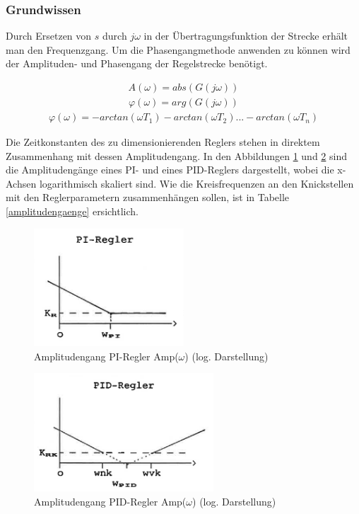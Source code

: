 \subsubsection{Grundwissen}
Durch Ersetzen von $s$ durch $j\omega$ in der Übertragungsfunktion der Strecke erhält man den Frequenzgang. Um die Phasengangmethode anwenden zu können wird der Amplituden- und Phasengang der Regelstrecke benötigt.


\begin{align}
A(\omega)=abs(G(j\omega))
\end{align}
\begin{align}
\varphi(\omega)=arg(G(j\omega))
\end{align}
\begin{align}
\varphi(\omega)=-arctan(\omega T_1)-arctan(\omega T_2)...-arctan(\omega T_n)
\end{align}\newline

Die Zeitkonstanten des zu dimensionierenden Reglers stehen in direktem Zusammenhang mit dessen Amplitudengang. In den Abbildungen \ref{agangpi} und \ref{agangpid} sind die Amplitudengänge eines PI- und eines PID-Reglers dargestellt, wobei die x-Achsen logarithmisch skaliert sind. Wie die Kreisfrequenzen an den Knickstellen mit den Reglerparametern zusammenhängen sollen, ist in Tabelle \ref{amplitudengaenge} ersichtlich.\newline

\begin{figure}[h]
\centering
\includegraphics[width=0.5\textwidth]{agangpi.png}
\caption{Amplitudengang PI-Regler Amp($\omega$) (log. Darstellung)}
\label{agangpi}
\end{figure}

\begin{figure}[h]
\centering
\includegraphics[width=0.6\textwidth]{agangpid.png}
\caption{Amplitudengang PID-Regler Amp($\omega$) (log. Darstellung)}
\label{agangpid}
\end{figure}

